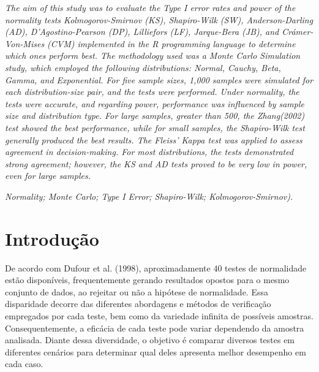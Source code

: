 \documentclass[a4paper,11pt]{article} %
\begin{document}
\begin{small}

 {\it 
    The aim of this study was to evaluate the Type I error rates and power of the normality tests Kolmogorov-Smirnov (KS), Shapiro-Wilk (SW), Anderson-Darling (AD), D'Agostino-Pearson (DP), Lilliefors (LF), Jarque-Bera (JB), and Crámer-Von-Mises (CVM) implemented in the R programming language to determine which ones perform best. The methodology used was a Monte Carlo Simulation study, which employed the following distributions: Normal, Cauchy, Beta, Gamma, and Exponential. For five sample sizes, 1,000 samples were simulated for each distribution-size pair, and the tests were performed. Under normality, the tests were accurate, and regarding power, performance was influenced by sample size and distribution type. For large samples, greater than 500, the \textit{Zhang(2002)} test showed the best performance, while for small samples, the Shapiro-Wilk test generally produced the best results. The Fleiss' Kappa test was applied to assess agreement in decision-making. For most distributions, the tests demonstrated strong agreement; however, the KS and AD tests proved to be very low in power, even for large samples.}\vspace{0.3cm}

  {\it Normality; Monte Carlo; Type I Error; Shapiro-Wilk; Kolmogorov-Smirnov).\vspace{0.3cm}}

\end{small}
\newpage                                                                                   
\pagestyle{fancy}                                                                          
\renewcommand{\thefootnote}{\roman{footnote}}                                              
\lhead{}
\chead{\small \slshape}
\rhead{\thepage}
\lfoot{}
\rfoot{}

\section{Introdução}

De acordo com Dufour et al. (1998), aproximadamente 40 testes de normalidade estão disponíveis, frequentemente gerando resultados opostos para o mesmo conjunto de dados, ao rejeitar ou não a hipótese de normalidade. Essa disparidade decorre das diferentes abordagens e métodos de verificação empregados por cada teste, bem como da variedade infinita de possíveis amostras. Consequentemente, a eficácia de cada teste pode variar dependendo da amostra analisada. Diante dessa diversidade, o objetivo é comparar diversos testes em diferentes cenários para determinar qual deles apresenta melhor desempenho em cada caso.\vskip0.3cm
\end{document}
